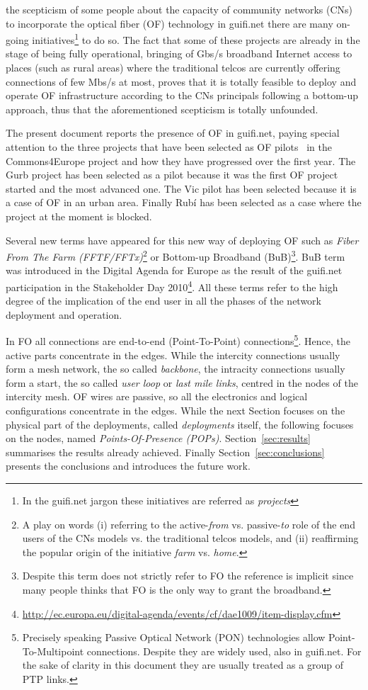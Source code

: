  the scepticism of some people about the capacity of community networks (CNs) to incorporate the optical fiber (OF) technology in guifi.net there are many on-going initiatives\footnote{In the guifi.net jargon these initiatives are referred as \emph{projects}} to do so. The fact that some of these projects are already in the stage of being fully operational, bringing of Gbs/s broadband Internet access to places (such as rural areas) where the traditional telcos are currently offering connections of few Mbs/s at most, proves that it is totally feasible to deploy and operate OF infrastructure according to the CNs principals following a bottom-up approach, thus that the aforementioned scepticism is totally unfounded.

The present document reports the presence of OF in guifi.net, paying special attention to the three projects that have been selected as OF pilots~\cite{barcelo2012bub} in the Commons4Europe project and how they have progressed over the first year. The Gurb project has been selected as a pilot because it was the first OF project started and the most advanced one. The Vic pilot has been selected because it is a case of OF in an urban area. Finally Rub\'{i} has been selected as a case where the project at the moment is blocked.

Several new terms have appeared for this new way of deploying OF such as \emph{Fiber From The Farm (FFTF/FFTx)}\footnote{A play on words (i) referring to the active-\emph{from} vs. passive-\emph{to} role of the end users of the CNs models vs. the traditional telcos models, and (ii) reaffirming the popular origin of the initiative \emph{farm} vs. \emph{home}. } or Bottom-up Broadband (BuB)\footnote{Despite this term does not strictly refer to FO the reference is implicit since many people thinks that FO is the only way to grant the broadband.}. BuB term was introduced in the Digital Agenda for Europe as the result of the guifi.net participation in the Stakeholder Day 2010\footnote{\url{http://ec.europa.eu/digital-agenda/events/cf/dae1009/item-display.cfm}}. All these terms refer to the high degree of the implication of the end user in all the phases of the network deployment and operation.

In FO all connections are end-to-end (Point-To-Point) connections\footnote{Precisely speaking Passive Optical Network (PON) technologies allow Point-To-Multipoint connections. Despite they are widely used, also in guifi.net. For the sake of clarity in this document they are usually treated as a group of PTP links.}. Hence, the active parts concentrate in the edges. While the intercity connections usually form a mesh network, the so called \emph{backbone}, the intracity connections usually form a start, the so called \emph{user loop} or \emph{last mile links}, centred in the nodes of the intercity mesh. OF wires are passive, so all the electronics and logical configurations concentrate in the edges. While the next Section focuses on the physical part of the deployments, called \emph{deployments} itself, the following focuses on the nodes, named \emph{Points-Of-Presence (POPs)}. Section~\ref{sec:results} summarises the results already achieved. Finally Section~\ref{sec:conclusions} presents the conclusions and introduces the future work.